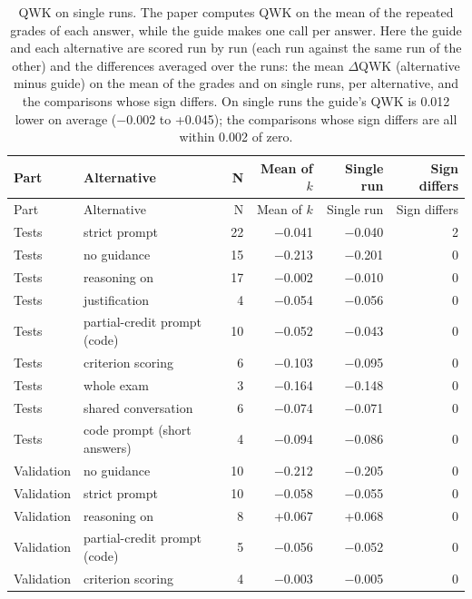 \documentclass[10pt]{article}
\begin{document}
\begingroup\footnotesize
\begin{longtable}{llrrrr}
\caption{QWK on single runs. The paper computes QWK on the mean of the repeated grades of each answer, while the guide makes one call per answer. Here the guide and each alternative are scored run by run (each run against the same run of the other) and the differences averaged over the runs: the mean $\Delta$QWK (alternative minus guide) on the mean of the grades and on single runs, per alternative, and the comparisons whose sign differs. On single runs the guide's QWK is 0.012 lower on average ($-$0.002 to +0.045); the comparisons whose sign differs are all within 0.002 of zero.}\\
\hline
Part & Alternative & N & Mean of $k$ & Single run & Sign differs \\ \hline
\endfirsthead
\hline
Part & Alternative & N & Mean of $k$ & Single run & Sign differs \\ \hline
\endhead
Tests & strict prompt & 22 & $-$0.041 & $-$0.040 & 2 \\
Tests & no guidance & 15 & $-$0.213 & $-$0.201 & 0 \\
Tests & reasoning on & 17 & $-$0.002 & $-$0.010 & 0 \\
Tests & justification & 4 & $-$0.054 & $-$0.056 & 0 \\
Tests & partial-credit prompt (code) & 10 & $-$0.052 & $-$0.043 & 0 \\
Tests & criterion scoring & 6 & $-$0.103 & $-$0.095 & 0 \\
Tests & whole exam & 3 & $-$0.164 & $-$0.148 & 0 \\
Tests & shared conversation & 6 & $-$0.074 & $-$0.071 & 0 \\
Tests & code prompt (short answers) & 4 & $-$0.094 & $-$0.086 & 0 \\
Validation & no guidance & 10 & $-$0.212 & $-$0.205 & 0 \\
Validation & strict prompt & 10 & $-$0.058 & $-$0.055 & 0 \\
Validation & reasoning on & 8 & +0.067 & +0.068 & 0 \\
Validation & partial-credit prompt (code) & 5 & $-$0.056 & $-$0.052 & 0 \\
Validation & criterion scoring & 4 & $-$0.003 & $-$0.005 & 0 \\
\hline
\end{longtable}
\endgroup
\end{document}
